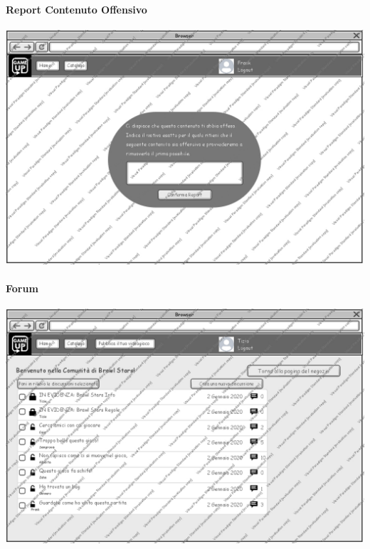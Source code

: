 \paragraph{Report Contenuto Offensivo}
\begin{center}
\includegraphics[width=\textwidth,height=\textheight,keepaspectratio]{Figure/Mockups/Report.jpg}
\end{center}

\newpage
\paragraph{Forum}
\begin{center}
\includegraphics[width=\textwidth,height=\textheight,keepaspectratio]{Figure/Mockups/Forum.jpg}
\end{center}

\newpage
